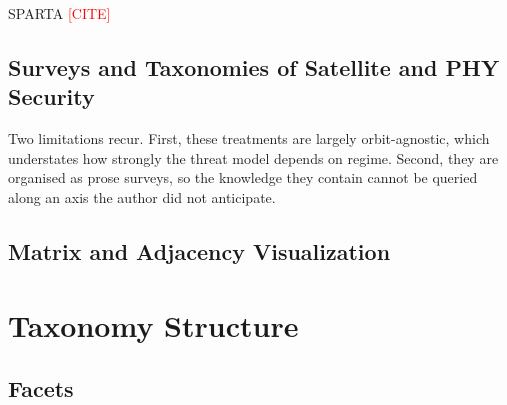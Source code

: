 \documentclass[10pt,a4paper]{article}
\newif\ifshowguides
\newcommand{\guide}[1]{%
  \ifshowguides
    {\par\smallskip\footnotesize\color{guidecol}%
     \textbf{[guide]}~#1\par\smallskip}%
  \fi}
\newcommand{\needcite}{\textcolor{red}{[CITE]}}
\begin{document}
SPARTA \needcite{}

\guide{\citet{remy2026systematictaxonomyattacksspace} is your closest
neighbour and a reviewer will reach it before you name it. Distinguish
explicitly and early: that work is a systematic taxonomy \emph{document}
at the infrastructure level; this is a queryable relational
\emph{instrument} at the physical layer. Say so in this subsection, not
in Limitations.}

\subsection{Surveys and Taxonomies of Satellite and PHY Security}

Two limitations recur. First, these treatments are largely
orbit-agnostic, which understates how strongly the threat model depends
on regime. Second, they are organised as prose surveys, so the knowledge
they contain cannot be queried along an axis the author did not
anticipate.

\subsection{Matrix and Adjacency Visualization}

\guide{Cite the DSM/N\textsuperscript{2} chart convention and any prior
work laying a matrix on a curved or 3D surface. If no such prior work
exists, say that plainly --- it is a stronger sentence than a vague
gesture at ``related visualization work''.}

\section{Taxonomy Structure}

\subsection{Facets}
\end{document}
